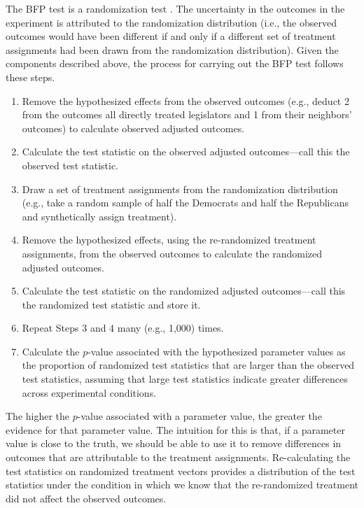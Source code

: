 \documentclass[12pt]{article}
\begin{document}
The BFP test is a randomization test \citep{basu2011randomization}. The uncertainty in the outcomes in the experiment is attributed to the randomization distribution (i.e., the observed outcomes would have been different if and only if a different set of treatment assignments had been drawn from the randomization distribution). Given the components described above, the process for carrying out the BFP test follows these steps.
\begin{enumerate}
\item Remove the hypothesized effects from the observed outcomes (e.g., deduct 2 from the outcomes all directly treated legislators and 1 from their neighbors' outcomes) to calculate observed adjusted outcomes.
\item Calculate the test statistic on the observed adjusted outcomes---call this the observed test statistic.
\item Draw a set of treatment assignments from the randomization distribution (e.g., take a random sample of half the Democrats and half the Republicans and synthetically assign treatment).
\item Remove the hypothesized effects, using the re-randomized treatment assignments, from the observed outcomes to calculate the randomized adjusted outcomes.
\item Calculate the test statistic on the randomized adjusted outcomes---call this the randomized test statistic and store it.
\item Repeat Steps 3 and 4 many (e.g., 1,000) times.
\item Calculate the $p$-value associated with the hypothesized parameter values as the proportion of randomized test statistics that are larger than the observed test statistics, assuming that large test statistics indicate greater differences across experimental conditions.
\end{enumerate} 
The higher the $p$-value associated with a parameter value, the greater the evidence for that parameter value. The intuition for this is that, if a parameter value is close to the truth, we should be able to use it to remove differences in outcomes that are attributable to the treatment assignments. Re-calculating the test statistics on randomized treatment vectors provides a distribution of the test statistics under the condition in which we know that the re-randomized treatment did not affect the observed outcomes. 
\end{document}
